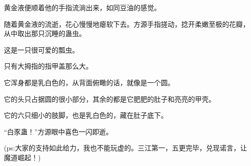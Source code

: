\begin{this_body}
黄金液便顺着他的手指流淌出来，如同豆油的感觉。

随着黄金液的流逝，花心慢慢地瘪软下去。方源手指搓动，捻开柔嫩至极的花瓣，从中取出那只沉睡的蛊虫。

这是一只很可爱的瓢虫。

只有大拇指的指甲盖那么大。

它浑身都是乳白色的，从背面俯瞰的话，就像是一个圆。

它的头只占据圆的很小部分，其余的都是它肥肥的肚子和亮亮的甲壳。

它的六只细小的肢脚，也是乳白色的，藏在肚子底下。

“白豕蛊！”方源眼中喜色一闪即逝。

(ps:大家的支持如此给力，我也不能玩虚的。三江第一，五更完毕，兑现诺言，让魔道崛起！)

\end{this_body}

